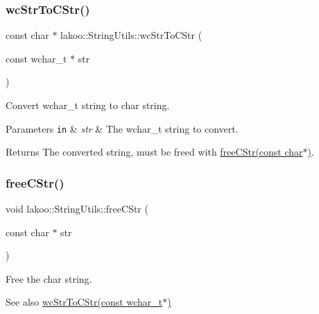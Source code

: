 \subsubsection{\texorpdfstring{wc\+Str\+To\+C\+Str()}{wcStrToCStr()}}
{\footnotesize\ttfamily const char $\ast$ lakoo\+::\+String\+Utils\+::wc\+Str\+To\+C\+Str (\begin{DoxyParamCaption}\item[{const wchar\+\_\+t $\ast$}]{str }\end{DoxyParamCaption})}



Convert wchar\+\_\+t string to char string. 


\begin{DoxyParams}[1]{Parameters}
\mbox{\tt in}  & {\em str} & The wchar\+\_\+t string to convert. \\
\hline
\end{DoxyParams}
\begin{DoxyReturn}{Returns}
The converted string, must be freed with \hyperlink{namespacelakoo_1_1_string_utils_aba915091fd9f6cc45a2720c936e3a680}{free\+C\+Str(const char$\ast$)}. 
\end{DoxyReturn}
\mbox{\label{namespacelakoo_1_1_string_utils_aba915091fd9f6cc45a2720c936e3a680}} 
\subsubsection{\texorpdfstring{free\+C\+Str()}{freeCStr()}}
{\footnotesize\ttfamily void lakoo\+::\+String\+Utils\+::free\+C\+Str (\begin{DoxyParamCaption}\item[{const char $\ast$}]{str }\end{DoxyParamCaption})}



Free the char string. 

\begin{DoxySeeAlso}{See also}
\hyperlink{namespacelakoo_1_1_string_utils_a13b1c55460bae1b1ebbab0164ebe722b}{wc\+Str\+To\+C\+Str(const wchar\+\_\+t$\ast$)} 
\end{DoxySeeAlso}
